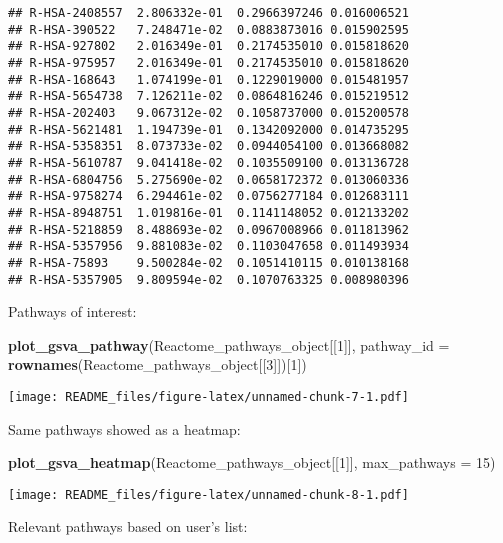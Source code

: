 \documentclass[
]{article}
\newenvironment{Shaded}{\begin{snugshade}}{\end{snugshade}}
\newcommand{\AttributeTok}[1]{\textcolor[rgb]{0.13,0.29,0.53}{#1}}
\newcommand{\DecValTok}[1]{\textcolor[rgb]{0.00,0.00,0.81}{#1}}
\newcommand{\FunctionTok}[1]{\textcolor[rgb]{0.13,0.29,0.53}{\textbf{#1}}}
\newcommand{\NormalTok}[1]{#1}
\begin{document}
\begin{verbatim}
## R-HSA-2408557  2.806332e-01  0.2966397246 0.016006521
## R-HSA-390522   7.248471e-02  0.0883873016 0.015902595
## R-HSA-927802   2.016349e-01  0.2174535010 0.015818620
## R-HSA-975957   2.016349e-01  0.2174535010 0.015818620
## R-HSA-168643   1.074199e-01  0.1229019000 0.015481957
## R-HSA-5654738  7.126211e-02  0.0864816246 0.015219512
## R-HSA-202403   9.067312e-02  0.1058737000 0.015200578
## R-HSA-5621481  1.194739e-01  0.1342092000 0.014735295
## R-HSA-5358351  8.073733e-02  0.0944054100 0.013668082
## R-HSA-5610787  9.041418e-02  0.1035509100 0.013136728
## R-HSA-6804756  5.275690e-02  0.0658172372 0.013060336
## R-HSA-9758274  6.294461e-02  0.0756277184 0.012683111
## R-HSA-8948751  1.019816e-01  0.1141148052 0.012133202
## R-HSA-5218859  8.488693e-02  0.0967008966 0.011813962
## R-HSA-5357956  9.881083e-02  0.1103047658 0.011493934
## R-HSA-75893    9.500284e-02  0.1051410115 0.010138168
## R-HSA-5357905  9.809594e-02  0.1070763325 0.008980396
\end{verbatim}

Pathways of interest:

\begin{Shaded}
\begin{Highlighting}[]
\FunctionTok{plot\_gsva\_pathway}\NormalTok{(Reactome\_pathways\_object[[}\DecValTok{1}\NormalTok{]], }\AttributeTok{pathway\_id =} \FunctionTok{rownames}\NormalTok{(Reactome\_pathways\_object[[}\DecValTok{3}\NormalTok{]])[}\DecValTok{1}\NormalTok{])}
\end{Highlighting}
\end{Shaded}

\texttt{[image: README\_files/figure-latex/unnamed-chunk-7-1.pdf]}

Same pathways showed as a heatmap:

\begin{Shaded}
\begin{Highlighting}[]
\FunctionTok{plot\_gsva\_heatmap}\NormalTok{(Reactome\_pathways\_object[[}\DecValTok{1}\NormalTok{]], }\AttributeTok{max\_pathways =} \DecValTok{15}\NormalTok{)}
\end{Highlighting}
\end{Shaded}

\texttt{[image: README\_files/figure-latex/unnamed-chunk-8-1.pdf]}

Relevant pathways based on user's list:
\end{document}
